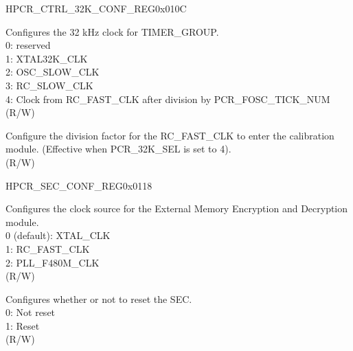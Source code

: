 \begin{register}{H}{PCR\_CTRL\_32K\_CONF\_REG}{0x010C}\label{regdesc:PCRCTRL32KCONFREG}
%
%
%
%
\regnewline%
\begin{regdesc}\begin{reglist}
\label{fielddesc:PCR32KSEL}\item [PCR\_32K\_SEL] Configures the 32 kHz clock for TIMER\_GROUP.\\
0: reserved\\
1: XTAL32K\_CLK\\
2: OSC\_SLOW\_CLK\\
3: RC\_SLOW\_CLK\\ 
4: Clock from RC\_FAST\_CLK after division by PCR\_FOSC\_TICK\_NUM\\(R/W)
\label{fielddesc:PCRFOSCTICKNUM}\item [PCR\_FOSC\_TICK\_NUM] Configure the division factor for the RC\_FAST\_CLK to enter the calibration module. (Effective when PCR\_32K\_SEL is set to 4). \\(R/W)
\end{reglist}\end{regdesc}
\end{register}


\begin{register}{H}{PCR\_SEC\_CONF\_REG}{0x0118}\label{regdesc:PCRSECCONFREG}
%
%
%
\regnewline%
\begin{regdesc}\begin{reglist}
\label{fielddesc:PCRSECCLKSEL}\item [PCR\_SEC\_CLK\_SEL] Configures the clock source for the External Memory Encryption and Decryption module.\\
0 (default): XTAL\_CLK\\
1: RC\_FAST\_CLK\\
2: PLL\_F480M\_CLK\\ (R/W)
\label{fielddesc:PCRSECRSTEN}\item [PCR\_SEC\_RST\_EN] Configures whether or not to reset the SEC.\\
0: Not reset\\
1: Reset\\(R/W)
\end{reglist}\end{regdesc}
\end{register}


